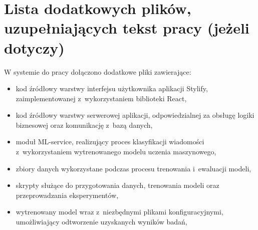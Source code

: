 \chapter{Lista dodatkowych plików, uzupełniających tekst pracy (jeżeli dotyczy)}

W systemie do pracy dołączono dodatkowe pliki zawierające:
\begin{itemize}
    \item kod źródłowy warstwy interfejsu użytkownika aplikacji Stylify, zaimplementowanej z~wykorzystaniem biblioteki React,
    \item kod źródłowy warstwy serwerowej aplikacji, odpowiedzialnej za obsługę logiki biznesowej oraz komunikację z~bazą danych,
    \item moduł ML-service, realizujący proces klasyfikacji wiadomości z~wykorzystaniem wytrenowanego modelu uczenia maszynowego,
    \item zbiory danych wykorzystane podczas procesu trenowania i~ewaluacji modeli,
    \item skrypty służące do przygotowania danych, trenowania modeli oraz przeprowadzania eksperymentów,
    \item wytrenowany model wraz z~niezbędnymi plikami konfiguracyjnymi, umożliwiający odtworzenie uzyskanych wyników badań,
\end{itemize}
